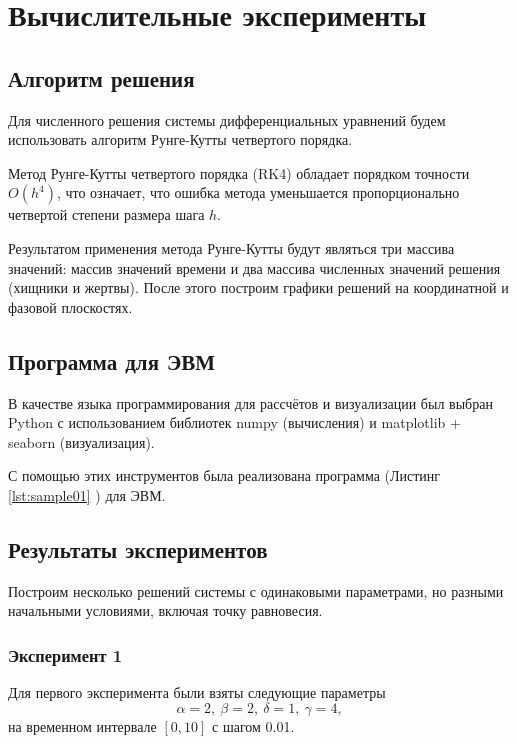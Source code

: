 \chapter{Вычислительные эксперименты}
\section{Алгоритм решения}

Для численного решения системы дифференциальных уравнений будем использовать алгоритм Рунге-Кутты \cite{1964calculus} четвертого порядка.

Метод Рунге-Кутты четвертого порядка (RK4) обладает порядком точности \( O(h^4) \), что означает, что ошибка метода уменьшается пропорционально четвертой степени размера шага \( h \). 

 Результатом применения метода Рунге-Кутты будут являться три массива значений: массив значений времени и два массива численных значений решения (хищники и жертвы). После этого построим графики решений на координатной и фазовой плоскостях.

\section{Программа для ЭВМ}

В качестве языка программирования для рассчётов и визуализации был выбран Python с использованием библиотек numpy (вычисления) и matplotlib + seaborn (визуализация).

С помощью этих инструментов была реализована программа (Листинг \ref{lst:sample01} ) для ЭВМ.
 

\section{Результаты экспериментов}
Построим несколько решений системы с одинаковыми параметрами, но разными начальными условиями, включая точку равновесия.
\subsection*{Эксперимент 1}
Для первого эксперимента были взяты следующие параметры $$\alpha = 2, \ \beta = 2, \ \delta = 1, \ \gamma = 4,$$
на временном интервале $[0,10]$ с шагом 0.01.
 
